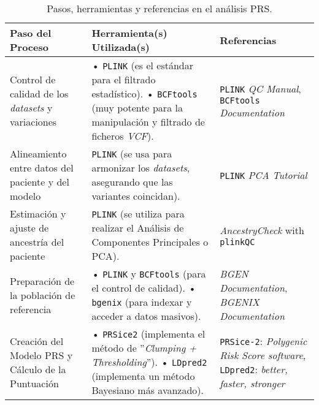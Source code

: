 \begin{table}[H]
    \centering
    \small
    \begin{tabularx}{\textwidth}{ >{\raggedright\arraybackslash}X >{\raggedright\arraybackslash}X >{\raggedright\arraybackslash}X }
        \toprule
        \textbf{Paso del Proceso} & \textbf{Herramienta(s) Utilizada(s)} & \textbf{Referencias} \\
        \midrule
        Control de calidad de los \textit{datasets} y variaciones & 
        • \texttt{PLINK} (es el estándar para el filtrado estadístico). \newline 
        • \texttt{BCFtools} (muy potente para la manipulación y filtrado de ficheros \textit{VCF}). 
        & \texttt{PLINK} \textit{QC Manual}, \texttt{BCFtools} \textit{Documentation}
        \\ \addlinespace

        Alineamiento entre datos del paciente y del modelo & 
        \texttt{PLINK} (se usa para armonizar los \textit{datasets}, asegurando que las variantes coincidan). 
        & \texttt{PLINK} \textit{PCA Tutorial}
        \\ \addlinespace

        Estimación y ajuste de ancestría del paciente & 
        \texttt{PLINK} (se utiliza para realizar el Análisis de Componentes Principales o PCA). 
        & \textit{AncestryCheck} with \texttt{plinkQC}
        \\ \addlinespace

        Preparación de la población de referencia &  
        • \texttt{PLINK} y \texttt{BCFtools} (para el control de calidad). \newline 
        • \texttt{bgenix} (para indexar y acceder a datos masivos). 
        & \textit{BGEN Documentation}, \textit{BGENIX Documentation}
        \\ \addlinespace

        Creación del Modelo PRS y Cálculo de la Puntuación & 
        • \texttt{PRSice2} (implementa el método de ''\textit{Clumping + Thresholding}''). \newline 
        • \texttt{LDpred2} (implementa un método Bayesiano más avanzado). 
        & \texttt{PRSice-2}: \textit{Polygenic Risk Score software}, \texttt{LDpred2}: \textit{better, faster, stronger}
        \\
        \bottomrule
    \end{tabularx}
    \caption{Pasos, herramientas y referencias en el análisis PRS.}
    \label{tab:prs_workflow}
\end{table}

